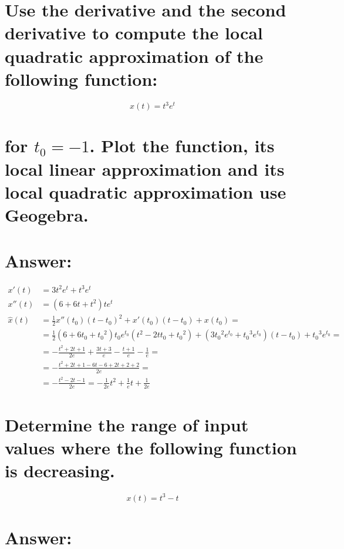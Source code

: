 \documentclass{article}
\begin{document}
\section{\normalfont Use the derivative and the second derivative to compute the local quadratic approximation of the following function:}

\begin{equation}
x(t) = t^3e^t
\end{equation}

\section*{\normalfont for $t_0 = -1$.  Plot the function, its local linear approximation and its local quadratic approximation use Geogebra.}

\section*{Answer:}

\begin{equation}
\begin{split}
x'(t) & = 3t^2e^t + t^3e^t\\
x''(t) & = (6 + 6t + t^2)te^t\\
\widehat{x}(t) &= \frac{1}{2}x''(t_0)(t-t_0)^2 + x'(t_0)(t-t_0) + x(t_0) = \\ 
& = \frac{1}{2}(6 + 6t_0 + {t_0}^2)t_0e^{t_0}(t^2 - 2tt_0 + {t_0}^2) + (3{t_0}^2e^{t_0} + {t_0}^3e^{t_0})(t-t_0) + {t_0}^3e^{t_0} = \\ 
& = -\frac{t^2 + 2t + 1}{2e} + \frac{3t + 3}{e} - \frac{t + 1}{e} - \frac{1}{e} = \\ 
& = -\frac{t^2 + 2t + 1 - 6t - 6 + 2t + 2 + 2}{2e} = \\ 
& = -\frac{t^2 - 2t - 1}{2e} = -\frac{1}{2e}t^2 + \frac{1}{e}t + \frac{1}{2e}
\end{split}
\end{equation}

\section{\normalfont Determine the range of input values where the following function is decreasing.}

\begin{equation}
x(t) = t^3 - t
\end{equation}

\section*{Answer:}
\end{document}
